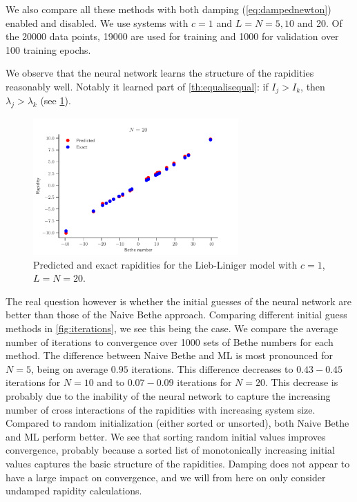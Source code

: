 \documentclass[11pt, a4paper]{report} %
\begin{document}
We also compare all these methods with both damping (\cref{eq:dampednewton}) enabled and disabled. We use systems with \(c=1\) and \(L=N=5,10\) and 20.
Of the 20000 data points, 19000 are used for training and 1000 for validation over 100 training epochs.

We observe that the neural network learns the structure of the rapidities reasonably well.
Notably it learned part of \cref{th:equalisequal}: if \(I_j >I_k\), then \(\lambda_j > \lambda_k\) (see \cref{fig:rapidities}).

\begin{figure}[tb]
  \centering
  \includegraphics[width=0.70\textwidth]{rapidities_20.pdf}
  \caption{Predicted and exact rapidities for the Lieb-Liniger model with \(c=1\), \(L=N=20\).}
  \label{fig:rapidities}
\end{figure}

The real question however is whether the initial guesses of the neural network are better than those of the Naive Bethe approach.
Comparing different initial guess methods in \cref{fig:iterations}, we see this being the case.
We compare the average number of iterations to convergence over 1000 sets of Bethe numbers for each method.
The difference between Naive Bethe and ML is most pronounced for \(N=5\), being on average \(0.95\) iterations.
This difference decreases to \(0.43-0.45\) iterations for \(N=10\) and to \(0.07-0.09\) iterations for \(N=20\).
This decrease is probably due to the inability of the neural network to capture the increasing number of cross interactions of the rapidities with increasing system size.
Compared to random initialization (either sorted or unsorted), both Naive Bethe and ML perform better.
We see that sorting random initial values improves convergence, probably because a sorted list of monotonically increasing initial values captures the basic structure of the rapidities.
Damping does not appear to have a large impact on convergence, and we will from here on only consider undamped rapidity calculations.
\end{document}
